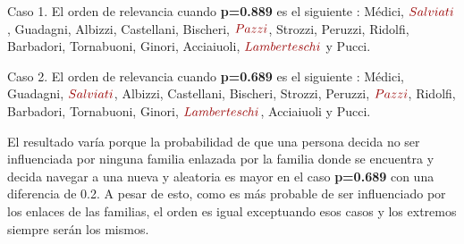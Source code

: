 \par Caso 1. El orden de relevancia cuando \textbf{p=0.889} es el siguiente : Médici, $\color{rojoOscuro}{Salviati}$, Guadagni, Albizzi, Castellani, Bischeri, $\color{rojoOscuro}{Pazzi}$, Strozzi, Peruzzi,
Ridolfi, Barbadori, Tornabuoni, Ginori, Acciaiuoli, $\color{rojoOscuro}{Lamberteschi}$ y Pucci.

\par Caso 2. El orden de relevancia cuando \textbf{p=0.689} es el siguiente : Médici, Guadagni, $\color{rojoOscuro}{Salviati}$, Albizzi, Castellani, Bischeri, Strozzi, Peruzzi, $\color{rojoOscuro}{Pazzi}$,
Ridolfi, Barbadori, Tornabuoni, Ginori, $\color{rojoOscuro}{Lamberteschi}$, Acciaiuoli  y Pucci.

\par El resultado varía porque la probabilidad de que una persona decida no ser influenciada por ninguna familia enlazada por la familia donde se encuentra 
y decida navegar a una nueva y aleatoria es mayor en el caso \textbf{p=0.689} con una diferencia de 0.2. A pesar de esto, como es más probable de ser influenciado 
por los enlaces de las familias, el orden es igual exceptuando esos casos y los extremos siempre serán los mismos.

